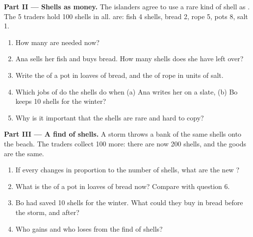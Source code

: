 \begin{problem}
\medskip
\noindent\textbf{Part II --- Shells as money.} The islanders agree to use a rare kind of shell
as . The 5 traders hold 100 shells in all.  are: fish 4 shells, bread 2, rope 5,
pots 8, salt 1.
\begin{enumerate}[resume]
  \item How many  are needed now?
  \item Ana sells her fish and buys bread. How many shells does she have left over?
  \item Write the  of a pot in loaves of bread, and the  of rope in units of salt.
  \item Which jobs of  do the shells do when (a) Ana writes her  on a slate,
        (b) Bo keeps 10 shells for the winter?
  \item Why is it important that the shells are rare and hard to copy?
\end{enumerate}

\medskip
\noindent\textbf{Part III --- A find of shells.} A storm throws a bank of the same shells onto
the beach. The traders collect 100 more: there are now 200 shells, and the goods are the
same.
\begin{enumerate}[resume]
  \item If every  changes in proportion to the number of shells, what are the new
        ?
  \item What is the  of a pot in loaves of bread now? Compare with question 6.
  \item Bo had saved 10 shells for the winter. What could they buy in bread before the
        storm, and after?
  \item Who gains and who loses from the find of shells?
\end{enumerate}
\end{problem}
